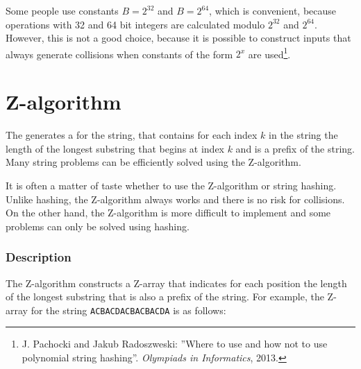 Some people use constants $B=2^{32}$ and $B=2^{64}$,
which is convenient, because operations with 32 and 64
bit integers are calculated modulo $2^{32}$ and $2^{64}$.
However, this is not a good choice, because it is possible
to construct inputs that always generate collisions when
constants of the form $2^x$ are used\footnote{
J. Pachocki and Jakub Radoszweski:
''Where to use and how not to use polynomial string hashing''.
\textit{Olympiads in Informatics}, 2013.
}.

\section{Z-algorithm}


The  generates a 
for the string, that contains for each index $k$
in the string the length of the longest substring
that begins at index $k$ and is a prefix of the string.
Many string problems can be efficiently solved
using the Z-algorithm.

It is often a matter of taste whether to use
the Z-algorithm or string hashing.
Unlike hashing, the Z-algorithm always works
and there is no risk for collisions.
On the other hand, the Z-algorithm is more difficult
to implement and some problems can only be solved
using hashing.

\subsubsection*{Description}

The Z-algorithm constructs a Z-array that
indicates for each position the length of the
longest substring that is also a prefix of the string.
For example, the Z-array for the string
\texttt{ACBACDACBACBACDA} is as follows:

